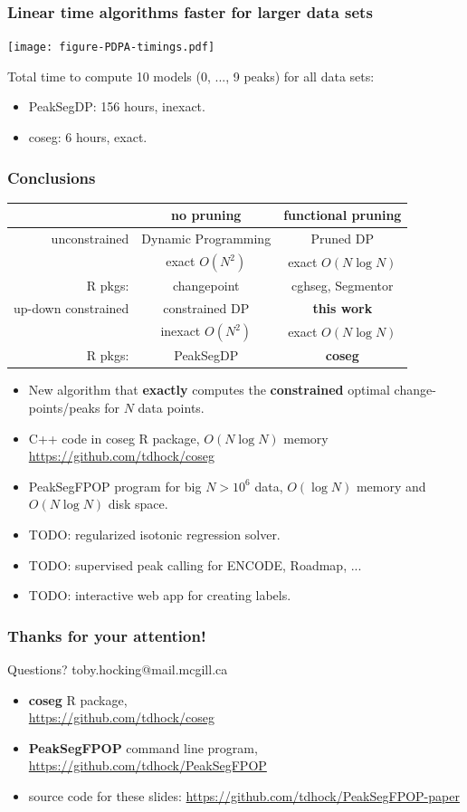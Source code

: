 \documentclass{beamer}
\begin{document}
\begin{frame}
  \frametitle{Linear time algorithms faster for larger data sets}
  \texttt{[image: figure-PDPA-timings.pdf]}

  Total time to compute 10 models (0, ..., 9 peaks) for all data sets:
  \begin{itemize}
  \item PeakSegDP: 156 hours, inexact.
  \item coseg: 6 hours, exact.
  \end{itemize}
\end{frame}


\begin{frame}
  \frametitle{Conclusions}
  \begin{tabular}{r|c|c}
    & no pruning & functional pruning \\
    \hline
    unconstrained & Dynamic Programming & Pruned DP \\
     & exact $O(N^2)$ & exact $O(N\log N)$\\
    R pkgs: & changepoint & cghseg, Segmentor\\
    \hline
    up-down constrained & constrained DP & \textbf{this work} \\
     & inexact $O(N^2)$ & exact $O(N\log N)$\\
    R pkgs: & PeakSegDP & \textbf{coseg}\\
    \hline
  \end{tabular}
  \begin{itemize}
  \item New algorithm that \textbf{exactly} computes the
    \textbf{constrained} optimal change-points/peaks for $N$ data points.
  \item C++ code in coseg R package, $O(N \log N)$ memory
    \url{https://github.com/tdhock/coseg}
  \item PeakSegFPOP program for big $N > 10^6$ data,
    $O(\log N)$ memory and $O(N\log N)$ disk space.
  \item TODO: regularized isotonic regression solver.
  \item TODO: supervised peak calling for ENCODE, Roadmap, ...
  \item TODO: interactive web app for creating labels.
  \end{itemize}
\end{frame}

\begin{frame}
  \frametitle{Thanks for your attention!}

  Questions? toby.hocking@mail.mcgill.ca
  \begin{itemize}
  \item 
  \textbf{coseg} R package, \\
  \url{https://github.com/tdhock/coseg}
  \item 
    \textbf{PeakSegFPOP} command line program, 
  \url{https://github.com/tdhock/PeakSegFPOP}
  \item source code for these slides:
  \url{https://github.com/tdhock/PeakSegFPOP-paper}
  \end{itemize}
\end{frame}
\end{document}
